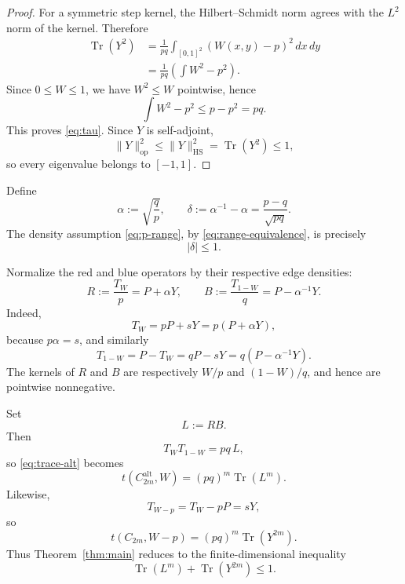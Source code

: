 \documentclass[11pt]{article}
\newcommand{\Tr}{\operatorname{Tr}}
\newcommand{\op}{\mathrm{op}}
\newcommand{\HS}{\mathrm{HS}}
\newcommand{\Alt}{\mathrm{alt}}
\begin{document}
\begin{proof}
For a symmetric step kernel, the Hilbert--Schmidt norm agrees with the $L^2$ norm of the kernel.  Therefore
\begin{align*}
   \Tr(Y^2)
   &=\frac{1}{pq}\int_{[0,1]^2}(W(x,y)-p)^2\,dx\,dy\\
   &=\frac{1}{pq}\left(\int W^2-p^2\right).
\end{align*}
Since $0\le W\le1$, we have $W^2\le W$ pointwise, hence
\[
   \int W^2-p^2\le p-p^2=pq.
\]
This proves \eqref{eq:tau}.  Since $Y$ is self-adjoint,
\[
   \|Y\|_{\op}^2\le\|Y\|_{\HS}^2=\Tr(Y^2)\le1,
\]
so every eigenvalue belongs to $[-1,1]$.
\end{proof}

Define
\begin{equation}
   \alpha:=\sqrt{\frac qp},
   \qquad
   \delta:=\alpha^{-1}-\alpha
   =\frac{p-q}{\sqrt{pq}}.
   \label{eq:alpha-delta}
\end{equation}
The density assumption \eqref{eq:p-range}, by \eqref{eq:range-equivalence}, is precisely
\begin{equation}
   |\delta|\le1.
   \label{eq:delta-bound}
\end{equation}

Normalize the red and blue operators by their respective edge densities:
\begin{equation}
   R:=\frac{T_W}{p}=P+\alpha Y,
   \qquad
   B:=\frac{T_{1-W}}q=P-\alpha^{-1}Y.
   \label{eq:R-B}
\end{equation}
Indeed,
\[
   T_W=pP+sY=p(P+\alpha Y),
\]
because $p\alpha=s$, and similarly
\[
   T_{1-W}=P-T_W=qP-sY=q(P-\alpha^{-1}Y).
\]
The kernels of $R$ and $B$ are respectively $W/p$ and $(1-W)/q$, and hence are pointwise nonnegative.

Set
\begin{equation}
   L:=RB.
   \label{eq:def-L}
\end{equation}
Then
\begin{equation}
   T_WT_{1-W}=pq\,L,
\end{equation}
so \eqref{eq:trace-alt} becomes
\begin{equation}
   t(C_{2m}^{\Alt},W)=(pq)^m\Tr(L^m).
   \label{eq:alt-normalized}
\end{equation}
Likewise,
\begin{equation}
   T_{W-p}=T_W-pP=sY,
\end{equation}
so
\begin{equation}
   t(C_{2m},W-p)
   =(pq)^m\Tr(Y^{2m}).
   \label{eq:centered-cycle-normalized}
\end{equation}
Thus Theorem~\ref{thm:main} reduces to the finite-dimensional inequality
\begin{equation}
   \Tr(L^m)+\Tr(Y^{2m})\le1.
   \label{eq:normalized-inequality}
\end{equation}
\end{document}
